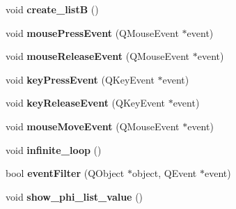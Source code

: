 \begin{DoxyCompactItemize}
\item 
\hypertarget{classofeli_1_1_image_viewer_a35076bf4e8c5af4cfd1a2fa27c863567}{void {\bfseries create\-\_\-list\-B} ()}\label{classofeli_1_1_image_viewer_a35076bf4e8c5af4cfd1a2fa27c863567}

\item 
\hypertarget{classofeli_1_1_image_viewer_a80832091bd71ca2b49fccc41d06e6c90}{void {\bfseries mouse\-Press\-Event} (Q\-Mouse\-Event $\ast$event)}\label{classofeli_1_1_image_viewer_a80832091bd71ca2b49fccc41d06e6c90}

\item 
\hypertarget{classofeli_1_1_image_viewer_a5a740136c914de611775ac2b68ea925b}{void {\bfseries mouse\-Release\-Event} (Q\-Mouse\-Event $\ast$event)}\label{classofeli_1_1_image_viewer_a5a740136c914de611775ac2b68ea925b}

\item 
\hypertarget{classofeli_1_1_image_viewer_a629aa0ee184fdfb436230e224b5957b4}{void {\bfseries key\-Press\-Event} (Q\-Key\-Event $\ast$event)}\label{classofeli_1_1_image_viewer_a629aa0ee184fdfb436230e224b5957b4}

\item 
\hypertarget{classofeli_1_1_image_viewer_af7a64aeac25f55bdaaf412939f393b6f}{void {\bfseries key\-Release\-Event} (Q\-Key\-Event $\ast$event)}\label{classofeli_1_1_image_viewer_af7a64aeac25f55bdaaf412939f393b6f}

\item 
\hypertarget{classofeli_1_1_image_viewer_aa8b83cdd4dcfcac62ef01e09d5d881bc}{void {\bfseries mouse\-Move\-Event} (Q\-Mouse\-Event $\ast$event)}\label{classofeli_1_1_image_viewer_aa8b83cdd4dcfcac62ef01e09d5d881bc}

\item 
\hypertarget{classofeli_1_1_image_viewer_a086dfab459e3060d90b94a9cd1ff1bfb}{void {\bfseries infinite\-\_\-loop} ()}\label{classofeli_1_1_image_viewer_a086dfab459e3060d90b94a9cd1ff1bfb}

\item 
\hypertarget{classofeli_1_1_image_viewer_a46ee5d42daaebda051a90f23e5aacc17}{bool {\bfseries event\-Filter} (Q\-Object $\ast$object, Q\-Event $\ast$event)}\label{classofeli_1_1_image_viewer_a46ee5d42daaebda051a90f23e5aacc17}

\item 
\hypertarget{classofeli_1_1_image_viewer_af83144951d25284a853dd1519a372ac1}{void {\bfseries show\-\_\-phi\-\_\-list\-\_\-value} ()}\label{classofeli_1_1_image_viewer_af83144951d25284a853dd1519a372ac1}


\end{DoxyCompactItemize}
